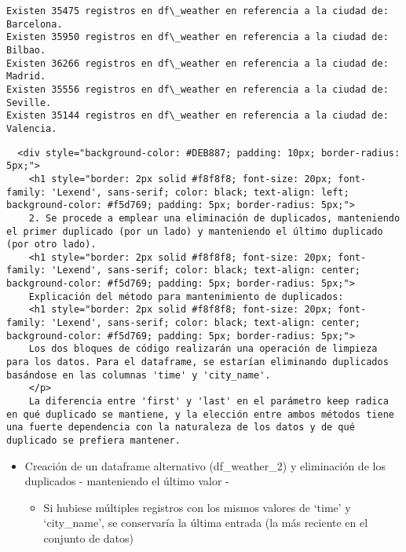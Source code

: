 \documentclass[11pt]{article}
\providecommand{\tightlist}{%
      \setlength{\itemsep}{0pt}\setlength{\parskip}{0pt}}
\begin{document}
    \begin{Verbatim}[commandchars=\\\{\}]
Existen 35475 registros en df\_weather en referencia a la ciudad de:  Barcelona.
Existen 35950 registros en df\_weather en referencia a la ciudad de: Bilbao.
Existen 36266 registros en df\_weather en referencia a la ciudad de: Madrid.
Existen 35556 registros en df\_weather en referencia a la ciudad de: Seville.
Existen 35144 registros en df\_weather en referencia a la ciudad de: Valencia.
    \end{Verbatim}

    \begin{verbatim}
  <div style="background-color: #DEB887; padding: 10px; border-radius: 5px;">
    <h1 style="border: 2px solid #f8f8f8; font-size: 20px; font-family: 'Lexend', sans-serif; color: black; text-align: left; background-color: #f5d769; padding: 5px; border-radius: 5px;">
    2. Se procede a emplear una eliminación de duplicados, manteniendo el primer duplicado (por un lado) y manteniendo el último duplicado (por otro lado).
    <h1 style="border: 2px solid #f8f8f8; font-size: 20px; font-family: 'Lexend', sans-serif; color: black; text-align: center; background-color: #f5d769; padding: 5px; border-radius: 5px;">
    Explicación del método para mantenimiento de duplicados:
    <h1 style="border: 2px solid #f8f8f8; font-size: 20px; font-family: 'Lexend', sans-serif; color: black; text-align: center; background-color: #f5d769; padding: 5px; border-radius: 5px;">
    Los dos bloques de código realizarán una operación de limpieza para los datos. Para el dataframe, se estarían eliminando duplicados basándose en las columnas 'time' y 'city_name'.
    </p>
    La diferencia entre 'first' y 'last' en el parámetro keep radica en qué duplicado se mantiene, y la elección entre ambos métodos tiene una fuerte dependencia con la naturaleza de los datos y de qué duplicado se prefiera mantener.
\end{verbatim}

    \begin{itemize}
\tightlist
\item
  Creación de un dataframe alternativo (df\_weather\_2) y eliminación de
  los duplicados - manteniendo el último valor -

  \begin{itemize}
  \tightlist
  \item
    Si hubiese múltiples registros con los mismos valores de `time' y
    `city\_name', se conservaría la última entrada (la más reciente en
    el conjunto de datos)
  \end{itemize}
\end{itemize}
\end{document}
